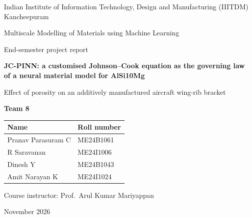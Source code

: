 \documentclass[11pt,a4paper]{article}
\begin{document}
\begin{titlepage}
\centering
{\large Indian Institute of Information Technology, Design and Manufacturing (IIITDM) Kancheepuram\par}
\vspace{0.8cm}
{\Large Multiscale Modelling of Materials using Machine Learning\par}
\vspace{0.3cm}
{\large End-semester project report\par}
\vspace{2.2cm}
{\LARGE\bfseries JC-PINN: a customised Johnson--Cook equation as the governing law of a neural material model for AlSi10Mg\par}
\vspace{0.6cm}
{\large Effect of porosity on an additively manufactured aircraft wing-rib bracket\par}
\vspace{2.2cm}
{\Large\bfseries Team 8\par}
\vspace{0.6cm}
\begin{tabular}{ll}
\toprule
Name & Roll number\\\midrule
Pranav Parasuram C & ME24B1061\\
R Saravanan & ME24I1006\\
Dinesh Y & ME24B1043\\
Amit Narayan K & ME24I1024\\\bottomrule
\end{tabular}
\vfill
{\large Course instructor: Prof.~Arul Kumar Mariyappan\par}
\vspace{0.4cm}
{\large November 2026\par}
\end{titlepage}
\end{document}
